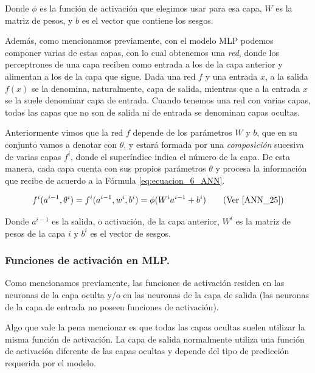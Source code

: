 \documentclass[12pt,a4paper]{article}
\begin{document}
\begin{sloppypar}
Donde $\phi$ es la función de activación que elegimos usar para esa capa, $W$ es la matriz de pesos, y $b$ es el vector que contiene los sesgos.

Además, como mencionamos previamente, con el modelo MLP podemos componer varias de estas capas, con lo cual obtenemos una \textit{red}, donde los perceptrones de una capa reciben como entrada a los de la capa anterior y alimentan a los de la capa que sigue. Dada una red $f$ y una entrada $x$, a la salida $f(x)$ se la denomina, naturalmente, capa de salida, mientras que a la entrada $x$ se la suele denominar capa de entrada. Cuando tenemos una red con varias capas, todas las capas que no son de salida ni de entrada se denominan capas ocultas. 

Anteriormente vimos que la red $f$ depende de los parámetros $W$ y $b$, que en su conjunto vamos a denotar con $\theta$, y estará formada por una \textit{composición} sucesiva de varias capas $f^i$, donde el superíndice indica el número de la capa. De esta manera, cada capa cuenta con sus propios parámetros $\theta$ y procesa la información que recibe de acuerdo a la Fórmula \ref{eq:ecuacion_6_ANN}.

\begin{equation}\label{eq:ecuacion_6_ANN}
f^i(a^{i-1},\theta^i) = f^i(a^{i-1},w^i,b^i) = \phi(W^{i}a^{i-1}+b^i)    \qquad  \text{(Ver \cite{ANN_25})}
\end{equation}

Donde $a^{i-1}$ es la salida, o activación, de la capa anterior, $W^i$ es la matriz de pesos de la capa $i$ y $b^i$ es el vector de sesgos.

\subsubsection{Funciones de activación en MLP.}\label{Func_activ}

Como mencionamos previamente, las funciones de activación residen en las neuronas de la capa oculta y/o en las neuronas de la capa de salida (las neuronas de la capa de entrada no poseen funciones de activación).

Algo que vale la pena mencionar es que todas las capas ocultas suelen utilizar la misma función de activación. La capa de salida normalmente utiliza una función de activación diferente de las capas ocultas y depende del tipo de predicción requerida por el modelo.


\end{sloppypar}
\end{document}
